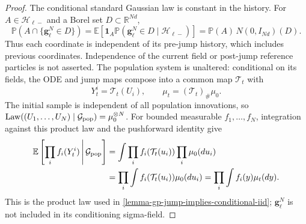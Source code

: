 \begin{proof}
The conditional standard Gaussian law is constant in the history. For
$A\in\mathcal H_{\ell-}$ and a Borel set $D\subset\mathbb R^{Nd}$,
\[
 \mathbb P(A\cap\{\mathbf g_\ell^N\in D\})
 =\mathbb E[\mathbf1_A\mathbb P(\mathbf g_\ell^N\in D\mid\mathcal H_{\ell-})]
 =\mathbb P(A)\,N(0,I_{Nd})(D).
\]
Thus each coordinate is independent of its pre-jump history, which includes
previous coordinates. Independence of the current field or post-jump
reference particles is not asserted. The population system is unaltered:
conditional on its fields, the ODE and jump maps compose into a common map
$\mathcal T_t$ with
\[
 Y_t^i=\mathcal T_t(U_i),\qquad\mu_t=(\mathcal T_t)_\#\mu_0.
\]
The initial sample is independent of all population innovations, so
$\operatorname{Law}((U_1,\ldots,U_N)\mid\mathcal G_{\rm pop})=\mu_0^{\otimes N}$.
For bounded measurable $f_1,\ldots,f_N$, integration against this product
law and the pushforward identity give
\begin{equation}
\label{eq:population-pushforward-product-law}
\begin{aligned}
 \mathbb E\left[\prod_i f_i(Y_t^i)\,\middle|\,\mathcal G_{\rm pop}\right]
 &=\int\prod_i f_i(\mathcal T_t(u_i))\prod_i\mu_0(du_i)\\
 &=\prod_i\int f_i(\mathcal T_t(u_i))\mu_0(du_i)
 =\prod_i\int f_i(y)\mu_t(dy).
\end{aligned}
\end{equation}
This is the product law used in \cref{lemma-gp-jump-implies-conditional-iid};
$\mathbf g_\ell^N$ is not included in its conditioning sigma-field.


\end{proof}
